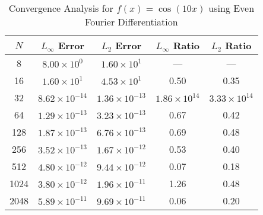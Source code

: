 \begin{table}[H]
	\centering
	\begin{tabular}{|c|c|c|c|c|}
		\hline
		$N$  & $L_\infty$ Error       & $L_2$ Error            & $L_\infty$ Ratio      & $L_2$ Ratio           \\
		\hline
		8    & $8.00 \times 10^{0}$   & $1.60 \times 10^{1}$   & ---                   & ---                   \\
		16   & $1.60 \times 10^{1}$   & $4.53 \times 10^{1}$   & 0.50                  & 0.35                  \\
		32   & $8.62 \times 10^{-14}$ & $1.36 \times 10^{-13}$ & $1.86 \times 10^{14}$ & $3.33 \times 10^{14}$ \\
		64   & $1.29 \times 10^{-13}$ & $3.23 \times 10^{-13}$ & 0.67                  & 0.42                  \\
		128  & $1.87 \times 10^{-13}$ & $6.76 \times 10^{-13}$ & 0.69                  & 0.48                  \\
		256  & $3.52 \times 10^{-13}$ & $1.67 \times 10^{-12}$ & 0.53                  & 0.40                  \\
		512  & $4.80 \times 10^{-12}$ & $9.44 \times 10^{-12}$ & 0.07                  & 0.18                  \\
		1024 & $3.80 \times 10^{-12}$ & $1.96 \times 10^{-11}$ & 1.26                  & 0.48                  \\
		2048 & $5.89 \times 10^{-11}$ & $9.69 \times 10^{-11}$ & 0.06                  & 0.20                  \\
		\hline
	\end{tabular}
	\caption{Convergence Analysis for $f(x) = \cos(10x)$ using Even Fourier Differentiation}
	\label{tab:cos10x}
\end{table}

